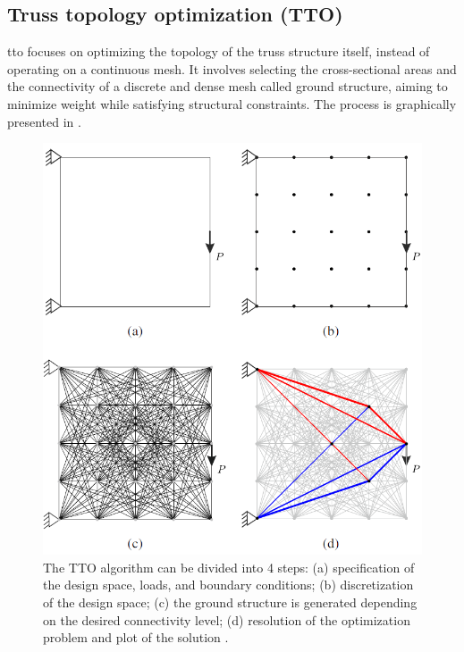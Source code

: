 \subsection{Truss topology optimization (TTO)}
\acrfull{tto} focuses on optimizing the topology of the truss structure itself, instead of operating on a continuous mesh. It involves selecting the cross-sectional areas and the connectivity of a discrete and dense mesh called ground structure, aiming to minimize weight while satisfying structural constraints. The process is graphically presented in .

\begin{figure}
    \centering
    \includegraphics[width=0.7\linewidth]{figures/02_literature/layopt.png}
    \caption{The TTO algorithm can be divided into 4 steps: (a)
    specification of the design space, loads, and boundary conditions; (b) discretization
    of the design space; (c) the ground structure is generated depending on the
    desired connectivity level; (d) resolution of the optimization problem and plot of
    the solution \cite{he_python_2019}.}
    \label{fig:02_tto_ex}
\end{figure}

